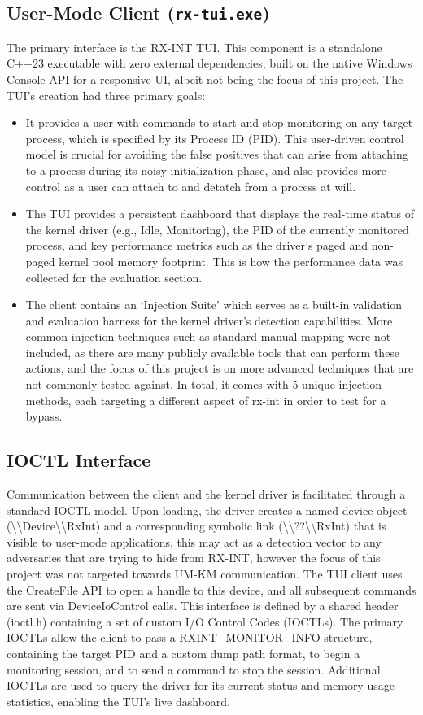 \documentclass[journal]{IEEEtran}
\begin{document}
\subsection{User-Mode Client (\texttt{rx-tui.exe})}
The primary interface is the RX-INT TUI. This component is a standalone C++23 executable with zero external dependencies, built on the native Windows Console API for a responsive UI, albeit not being the focus of this project. The TUI's creation had three primary goals:
\begin{itemize}
\item It provides a user with commands to start and stop monitoring on any target process, which is specified by its Process ID (PID). This user-driven control model is crucial for avoiding the false positives that can arise from attaching to a process during its noisy initialization phase, and also provides more control as a user can attach to and detatch from a process at will.
\item The TUI provides a persistent dashboard that displays the real-time status of the kernel driver (e.g., Idle, Monitoring), the PID of the currently monitored process, and key performance metrics such as the driver's paged and non-paged kernel pool memory footprint. This is how the performance data was collected for the evaluation section.
\item The client contains an `Injection Suite' which serves as a built-in validation and evaluation harness for the kernel driver's detection capabilities. More common injection techniques such as standard manual-mapping were not included, as there are many publicly available tools that can perform these actions, and the focus of this project is on more advanced techniques that are not commonly tested against. In total, it comes with 5 unique injection methods, each targeting a different aspect of rx-int in order to test for a bypass.
\end{itemize}
\subsection{IOCTL Interface}
Communication between the client and the kernel driver is facilitated through a standard IOCTL model. Upon loading, the driver creates a named device object (\textbackslash\textbackslash Device\textbackslash\textbackslash RxInt) and a corresponding symbolic link (\textbackslash\textbackslash??\textbackslash\textbackslash RxInt) that is visible to user-mode applications, this may act as a detection vector to any adversaries that are trying to hide from RX-INT, however the focus of this project was not targeted towards UM-KM communication. The TUI client uses the CreateFile API to open a handle to this device, and all subsequent commands are sent via DeviceIoControl calls.
This interface is defined by a shared header (ioctl.h) containing a set of custom I/O Control Codes (IOCTLs). The primary IOCTLs allow the client to pass a RXINT\_MONITOR\_INFO structure, containing the target PID and a custom dump path format, to begin a monitoring session, and to send a command to stop the session. Additional IOCTLs are used to query the driver for its current status and memory usage statistics, enabling the TUI's live dashboard.
\end{document}
